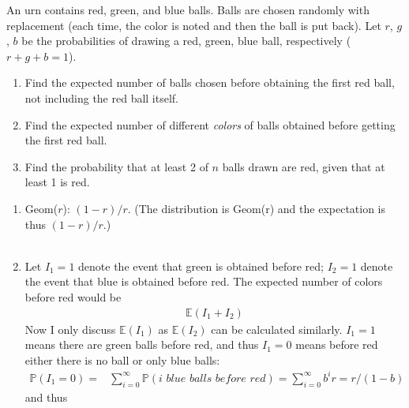 
\setcounter{theorem}{56}
\begin{exercise} [BH.4.57] An urn contains red, green, and blue balls. Balls are chosen randomly with replacement (each time, the color is noted and then the ball is put back). Let $r$, $g$, $b$ be the probabilities of drawing a red, green, blue ball, respectively ($r + g + b = 1$).
	\begin{enumerate}
		\item Find the expected number of balls chosen before obtaining the first red ball, not including the red ball itself.
		\item Find the expected number of different \emph{colors} of balls obtained before getting the first red ball.
		\item Find the probability that at least 2 of $n$ balls drawn are red, given that at least 1 is red.
	\end{enumerate}
\begin{solution}
    \begin{enumerate}
	    \item  Geom($r$): $(1-r)/r$. (The distribution is Geom(r) and the expectation is thus $(1-r)/r$.)\\~\\
        \item %
        Let $I_1=1$ denote the event that green is obtained before red; $I_2=1$ denote the event that blue is obtained before red. The expected number of colors before red would be 
        \begin{align*}
        	\mathbb{E} (I_1+I_2) 
        \end{align*}  
        Now I only discuss $\mathbb{E} (I_1) $ 
        as $\mathbb{E} (I_2) $ can be calculated similarly. $I_1=1$ means there are green balls before red, and thus $I_1=0$ means before red either there is no ball or only blue balls:
        \begin{align*}
        	\mathbb{P}\left(I_1=0 \right) =& \sum_{i=0}^\infty \mathbb{P}\left( \textit{i blue balls before red} \right) = \sum_{i=0}^\infty b^i r = r/(1-b) 
        \end{align*}
        and thus
        \begin{align*}

\end{align*}
\end{enumerate}
\end{solution}
\end{exercise}
